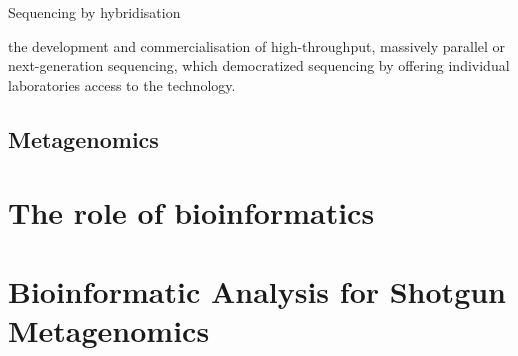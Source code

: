 Sequencing by hybridisation

the development and commercialisation of high-throughput, massively parallel or next-generation sequencing, which democratized sequencing by offering individual laboratories access to the technology.




\subsection{Metagenomics}


\section{The role of bioinformatics}


\section{Bioinformatic Analysis for Shotgun Metagenomics}

